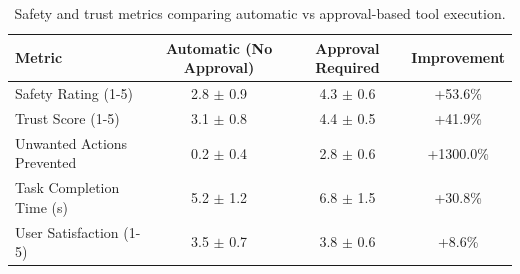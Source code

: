 \begin{table}[t]
\centering
\caption{Safety and trust metrics comparing automatic vs approval-based tool execution.}
\label{tab:safety}
\begin{tabular}{lccc}
\toprule
Metric & Automatic (No Approval) & Approval Required & Improvement \\
\midrule
Safety Rating (1-5) & 2.8 $\pm$ 0.9 & 4.3 $\pm$ 0.6 & +53.6\% \\
Trust Score (1-5) & 3.1 $\pm$ 0.8 & 4.4 $\pm$ 0.5 & +41.9\% \\
Unwanted Actions Prevented & 0.2 $\pm$ 0.4 & 2.8 $\pm$ 0.6 & +1300.0\% \\
Task Completion Time (s) & 5.2 $\pm$ 1.2 & 6.8 $\pm$ 1.5 & +30.8\% \\
User Satisfaction (1-5) & 3.5 $\pm$ 0.7 & 3.8 $\pm$ 0.6 & +8.6\% \\
\bottomrule
\end{tabular}
\end{table}